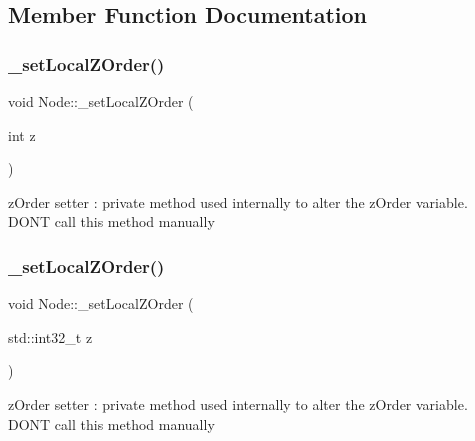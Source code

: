 \subsection{Member Function Documentation}
\mbox{\label{classNode_a9228657d144a272e8ac471c5a9b9e0dc}} 
\subsubsection{\texorpdfstring{\+\_\+set\+Local\+Z\+Order()}{\_setLocalZOrder()}\hspace{0.1cm}{\footnotesize\ttfamily [1/2]}}
{\footnotesize\ttfamily void Node\+::\+\_\+set\+Local\+Z\+Order (\begin{DoxyParamCaption}\item[{int}]{z }\end{DoxyParamCaption})\hspace{0.3cm}{\ttfamily [virtual]}}

z\+Order setter \+: private method used internally to alter the z\+Order variable. D\+ON\textquotesingle{}T call this method manually \mbox{\label{classNode_ae0ab4e6bbde6dad91266f8fde8e25b77}} 
\subsubsection{\texorpdfstring{\+\_\+set\+Local\+Z\+Order()}{\_setLocalZOrder()}\hspace{0.1cm}{\footnotesize\ttfamily [2/2]}}
{\footnotesize\ttfamily void Node\+::\+\_\+set\+Local\+Z\+Order (\begin{DoxyParamCaption}\item[{std\+::int32\+\_\+t}]{z }\end{DoxyParamCaption})\hspace{0.3cm}{\ttfamily [virtual]}}

z\+Order setter \+: private method used internally to alter the z\+Order variable. D\+ON\textquotesingle{}T call this method manually \mbox{\label{classNode_a132699398b350e83b548a5645e69beb0}} 
